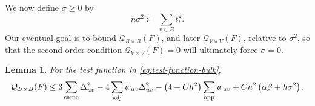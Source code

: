 \documentclass[reqno,11pt]{amsart}
\newtheorem{lemma}{Lemma}
\theoremstyle{definition}
\newcommand{\cQ}{\mathcal{Q}}
\newcommand{\paren}[1]{\left(#1\right)}
\begin{document}
We now define $\sigma\ge0$ by
\begin{equation}\label{eq:sigma-definition}
    n\sigma^2:=\sum_{v\in B}t_v^2.
\end{equation}
Our eventual goal is to bound $\mathcal{Q}_{B\times B}(F)$, and later $\mathcal{Q}_{V\times V}(F)$, relative to $\sigma^2$, so that the second-order condition $\mathcal{Q}_{V \times V}(F) = 0$ will ultimately force $\sigma = 0$.

\begin{lemma}\label{lem:q-b-b-bound-step-1}
For the test function in \eqref{eq:test-function-bulk},
\begin{equation}\label{eq:q-b-times-b-final-ub}
\cQ_{B\times B}(F)
\le 3\sum_{\mathrm{same}}\Delta_{uv}^2
-4\sum_{\mathrm{adj}}w_{uv}\Delta_{uv}^2
-\paren{4-Ch^2}\sum_{\mathrm{opp}}w_{uv}\notag+Cn^2\paren{\alpha\beta+h\sigma^2}.
\end{equation}
\end{lemma}
\end{document}
